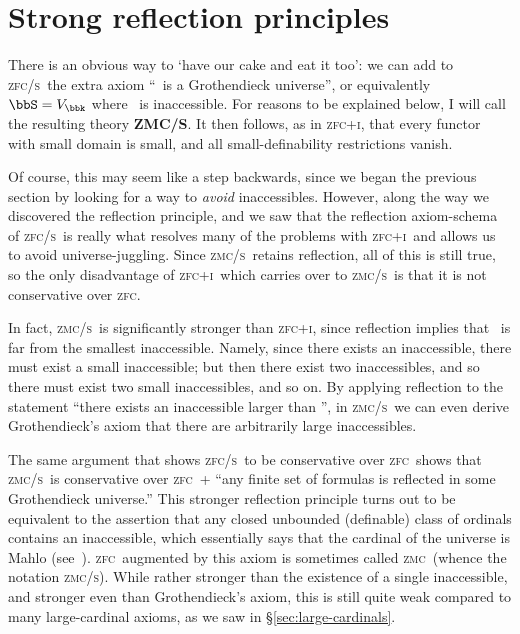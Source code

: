 \documentclass{amsart}
\def\zfc{\textsc{zfc}}
\def\zfci{\textsc{zfc+i}}
\def\zfcs{\textsc{zfc/s}}
\def\zmc{\textsc{zmc}}
\def\zmcs{\textsc{zmc/s}}
\begin{document}
\section{Strong reflection principles}
\label{sec:strong-reflect}

There is an obvious way to `have our cake and eat it too': we can add
to \zfcs\ the extra axiom ``\bbS\ is a Grothendieck universe'', or
equivalently $\bbS=V_\bbk$ where \bbk\ is inaccessible.  For reasons
to be explained below, I will call the resulting theory
\textbf{ZMC/S}.  It then follows, as in \zfci, that every functor with
small domain is small, and all small-definability restrictions vanish.

Of course, this may seem like a step backwards, since we began the
previous section by looking for a way to \emph{avoid} inaccessibles.
However, along the way we discovered the reflection principle, and we
saw that the reflection axiom-schema of \zfcs\ is really what resolves
many of the problems with \zfci\ and allows us to avoid
universe-juggling.  Since \zmcs\ retains reflection, all of this is
still true, so the only disadvantage of \zfci\ which carries over to
\zmcs\ is that it is not conservative over \zfc.

In fact, \zmcs\ is significantly stronger than \zfci, since reflection
implies that \bbk\ is far from the smallest inaccessible.  Namely,
since there exists an inaccessible, there must exist a small
inaccessible; but then there exist two inaccessibles, and so there
must exist two small inaccessibles, and so on.  By applying reflection
to the statement ``there exists an inaccessible larger than \al'', in
\zmcs\ we can even derive Grothendieck's axiom that there are
arbitrarily large inaccessibles.

The same argument that shows \zfcs\ to be conservative over \zfc\
shows that \zmcs\ is conservative over \zfc\ + ``any finite set of
formulas is reflected in some Grothendieck universe.''  This stronger
reflection principle turns out to be equivalent to the assertion that
any closed unbounded (definable) class of ordinals contains an
inaccessible, which essentially says that the cardinal of the universe
is Mahlo (see~\cite{levy:strong-inf}).  \zfc\ augmented by this axiom
is sometimes called \zmc\ (whence the notation \zmcs).  While rather
stronger than the existence of a single inaccessible, and stronger
even than Grothendieck's axiom, this is still quite weak compared to
many large-cardinal axioms, as we saw in \S\ref{sec:large-cardinals}.
\end{document}
